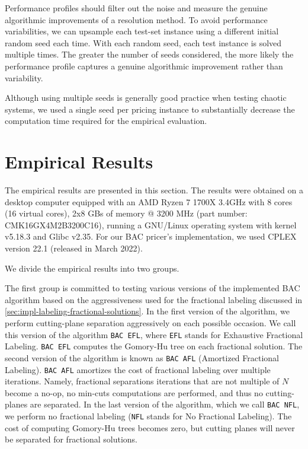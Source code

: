 Performance profiles should filter out the noise and measure the genuine algorithmic improvements of a resolution method.
To avoid performance variabilities, we can upsample each test-set instance using a different initial random seed each time.
With each random seed, each test instance is solved multiple times.
The greater the number of seeds considered, the more likely the performance profile captures a genuine algorithmic improvement rather than variability.

Although using multiple seeds is generally good practice when testing chaotic systems, we used a single seed per pricing instance to substantially decrease the computation time required for the empirical evaluation.

\section{Empirical Results}
\label{sec:results-empirical-results}

The empirical results are presented in this section.
The results were obtained on a desktop computer equipped with
an AMD Ryzen 7 1700X 3.4GHz with 8 cores (16 virtual cores),
2x8 GBs of memory @ 3200 MHz (part number: CMK16GX4M2B3200C16),
running a GNU/Linux operating system with kernel v5.18.3 and Glibc v2.35.
For our BAC pricer's implementation, we used CPLEX version 22.1 (released in March 2022).

\medskip

We divide the empirical results into two groups.

\medskip

The first group is committed to testing various versions of the implemented BAC algorithm based on the aggressiveness used for the fractional labeling discussed in \cref{sec:impl-labeling-fractional-solutions}.
In the first version of the algorithm, we perform cutting-plane separation aggressively on each possible occasion.
We call this version of the algorithm \texttt{BAC EFL}, where \texttt{EFL} stands for Exhaustive Fractional Labeling.
\texttt{BAC EFL} computes the Gomory-Hu tree on each fractional solution.
The second version of the algorithm is known as \texttt{BAC AFL} (Amortized Fractional Labeling).
\texttt{BAC AFL} amortizes the cost of fractional labeling over multiple iterations.
Namely, fractional separations iterations that are not multiple of $N$ become a no-op, no min-cuts computations are performed, and thus no cutting-planes are separated.
In the last version of the algorithm, which we call \texttt{BAC NFL}, we perform no fractional labeling (\texttt{NFL} stands for No Fractional Labeling).
The cost of computing Gomory-Hu trees becomes zero, but cutting planes will never be separated for fractional solutions.

